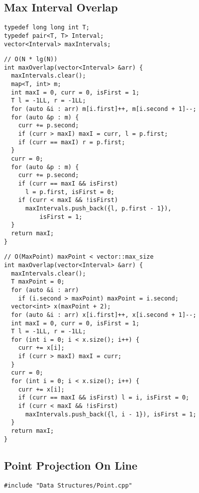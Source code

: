 \documentclass[twoside]{article}
\begin{document}
\begin{multicols*}{2}
\subsection*{Max Interval Overlap}
\begin{verbatim}
typedef long long int T;
typedef pair<T, T> Interval;
vector<Interval> maxIntervals;
\end{verbatim}
\vspace{-12pt}
\begin{verbatim}
// O(N * lg(N))
int maxOverlap(vector<Interval> &arr) {
  maxIntervals.clear();
  map<T, int> m;
  int maxI = 0, curr = 0, isFirst = 1;
  T l = -1LL, r = -1LL;
  for (auto &i : arr) m[i.first]++, m[i.second + 1]--;
  for (auto &p : m) {
    curr += p.second;
    if (curr > maxI) maxI = curr, l = p.first;
    if (curr == maxI) r = p.first;
  }
  curr = 0;
  for (auto &p : m) {
    curr += p.second;
    if (curr == maxI && isFirst)
      l = p.first, isFirst = 0;
    if (curr < maxI && !isFirst)
      maxIntervals.push_back({l, p.first - 1}),
          isFirst = 1;
  }
  return maxI;
}
\end{verbatim}
\vspace{-12pt}
\begin{verbatim}
// O(MaxPoint) maxPoint < vector::max_size
int maxOverlap(vector<Interval> &arr) {
  maxIntervals.clear();
  T maxPoint = 0;
  for (auto &i : arr)
    if (i.second > maxPoint) maxPoint = i.second;
  vector<int> x(maxPoint + 2);
  for (auto &i : arr) x[i.first]++, x[i.second + 1]--;
  int maxI = 0, curr = 0, isFirst = 1;
  T l = -1LL, r = -1LL;
  for (int i = 0; i < x.size(); i++) {
    curr += x[i];
    if (curr > maxI) maxI = curr;
  }
  curr = 0;
  for (int i = 0; i < x.size(); i++) {
    curr += x[i];
    if (curr == maxI && isFirst) l = i, isFirst = 0;
    if (curr < maxI && !isFirst)
      maxIntervals.push_back({l, i - 1}), isFirst = 1;
  }
  return maxI;
}
\end{verbatim}

\subsectionfont{\large\bfseries\sffamily\underline}
\subsection*{Point Projection On Line}
\begin{verbatim}
#include "Data Structures/Point.cpp"


\end{verbatim}
\end{multicols*}
\end{document}

